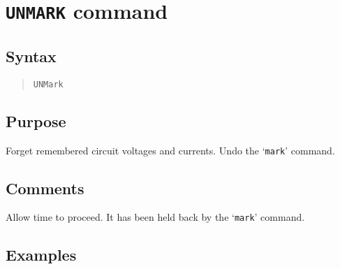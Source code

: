 \section{{\tt UNMARK} command}
\subsection{Syntax}
\begin{verse}
{\tt UNMark}
\end{verse}
\subsection{Purpose}

Forget remembered circuit voltages and currents.  Undo the `{\tt mark}'
command.
\subsection{Comments}

Allow time to proceed.  It has been held back by the `{\tt mark}' command.
\subsection{Examples}

